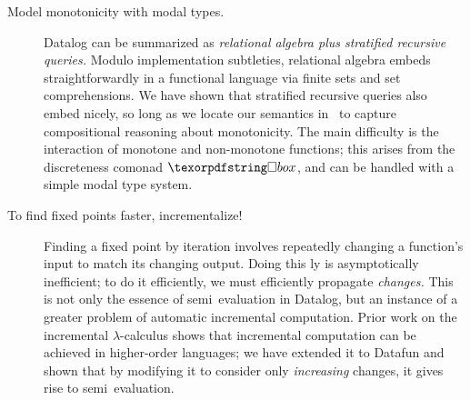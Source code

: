 
\begin{description}
\item[Model monotonicity with modal types.]
  Datalog can be summarized as \emph{relational algebra plus stratified
  recursive queries.} Modulo implementation subtleties, relational algebra
  embeds straightforwardly in a functional language via finite sets and set
  comprehensions. We have shown that stratified recursive queries also embed
  nicely, so long as we locate our semantics in \Poset\ to capture compositional
  reasoning about monotonicity.
  The main difficulty is the interaction of monotone and non-monotone functions;
  this arises from the discreteness comonad $\iso$, and can be handled with
  a simple modal type system.

\item[{To find fixed points faster, incrementalize!}] Finding a fixed point by
  iteration involves repeatedly changing a function's input to match its
  changing output. Doing this \naive{}ly is asymptotically inefficient; to do it
  efficiently, we must efficiently propagate \emph{changes.}
%
  This is not only the essence of semi\naive\ evaluation in Datalog, but an
  instance of a greater problem of automatic incremental computation.
%
  Prior work on the incremental $\lambda$-calculus shows that incremental
  computation can be achieved in higher-order languages; we have extended it to
  Datafun and shown that by modifying it to consider only \emph{increasing}
  changes, it gives rise to semi\naive\ evaluation.

\end{description}
